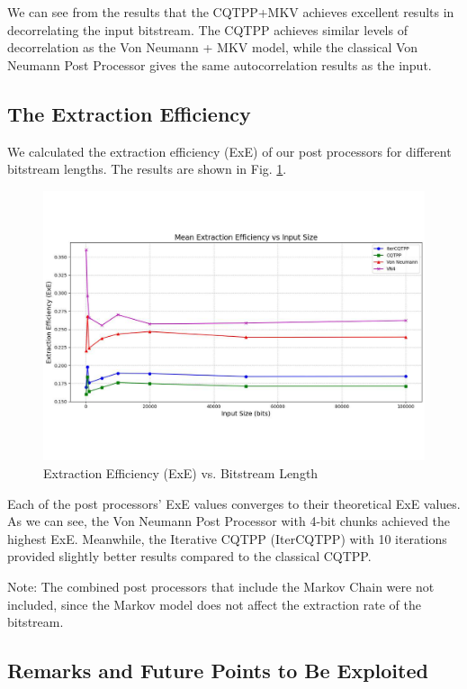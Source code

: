 We can see from the results that the CQTPP+MKV achieves excellent results in decorrelating the input bitstream. The CQTPP achieves similar levels of decorrelation as the Von Neumann + MKV model, while the classical Von Neumann Post Processor gives the same autocorrelation results as the input.



\subsection{The Extraction Efficiency}

We calculated the extraction efficiency (ExE) of our post processors for different bitstream lengths. The results are shown in Fig. \ref{fig:grph6}.

\begin{figure}[h!]
    \centering
    \includegraphics[width=\textwidth]{figures/ExE all.pdf}
    \caption{Extraction Efficiency (ExE) vs. Bitstream Length}
    \label{fig:grph6}
\end{figure}

Each of the post processors' ExE values converges to their theoretical ExE values. As we can see, the Von Neumann Post Processor with 4-bit chunks achieved the highest ExE. Meanwhile, the Iterative CQTPP (IterCQTPP) with 10 iterations provided slightly better results compared to the classical CQTPP.

Note: The combined post processors that include the Markov Chain were not included, since the Markov model does not affect the extraction rate of the bitstream.

\subsection{Remarks and Future Points to Be Exploited}

